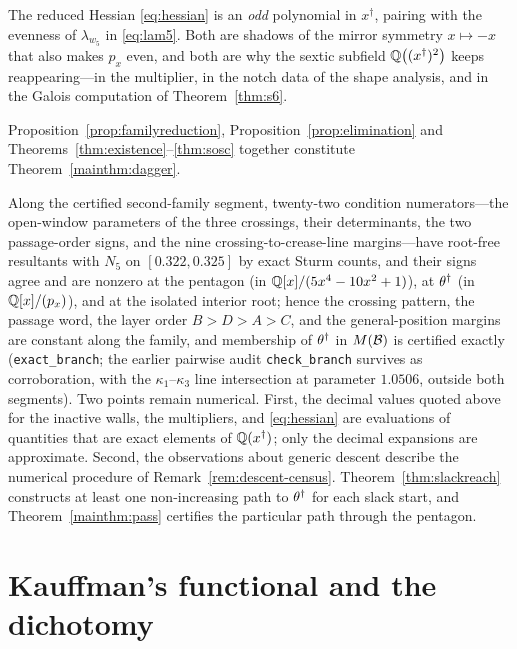 \begin{remark}[Parity]\label{rem:parity}
The reduced Hessian \eqref{eq:hessian} is an \emph{odd} polynomial in $x^\dagger$, pairing with the evenness of $\lambda_{w_5}$ in \eqref{eq:lam5}. Both are shadows of the mirror symmetry $x\mapsto-x$ that also makes $p_x$ even, and both are why the sextic subfield $\mathbb{Q}\bigl((x^\dagger)^2\bigr)$ keeps reappearing---in the multiplier, in the notch data of the shape analysis, and in the Galois computation of Theorem~\ref{thm:s6}.
\end{remark}

Proposition~\ref{prop:familyreduction}, Proposition~\ref{prop:elimination} and Theorems~\ref{thm:existence}--\ref{thm:sosc} together constitute Theorem~\ref{mainthm:dagger}.

\begin{remark}\label{rem:branchaudit}
Along the certified second-family segment, twenty-two condition numerators---the open-window parameters of the three crossings, their determinants, the two passage-order signs, and the nine crossing-to-crease-line margins---have root-free resultants with $N_5$ on $[0.322,0.325]$ by exact Sturm counts, and their signs agree and are nonzero at the pentagon (in $\mathbb{Q}[x]/(5x^4-10x^2+1)$), at $\theta^\dagger$ (in $\mathbb{Q}[x]/(p_x)$), and at the isolated interior root; hence the crossing pattern, the passage word, the layer order $B>D>A>C$, and the general-position margins are constant along the family, and membership of $\theta^\dagger$ in $M(\mathcal{B})$ is certified exactly (\texttt{exact\_branch}; the earlier pairwise audit \texttt{check\_branch} survives as corroboration, with the $\kappa_1$--$\kappa_3$ line intersection at parameter $1.0506$, outside both segments). Two points remain numerical. First, the decimal values quoted above for the inactive walls, the multipliers, and \eqref{eq:hessian} are evaluations of quantities that are exact elements of $\mathbb{Q}(x^\dagger)$; only the decimal expansions are approximate. Second, the observations about generic descent describe the numerical procedure of Remark~\ref{rem:descent-census}. Theorem~\ref{thm:slackreach} constructs at least one non-increasing path to $\theta^\dagger$ for each slack start, and Theorem~\ref{mainthm:pass} certifies the particular path through the pentagon.
\end{remark}

\section{Kauffman's functional and the dichotomy}\label{sec:kauffman}

